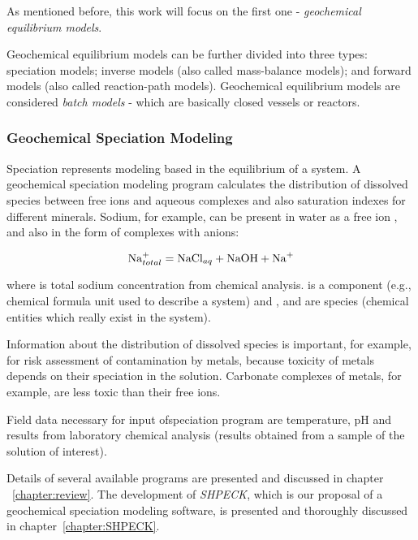 As mentioned before, this work will focus on the first one - \emph{geochemical equilibrium models}.

Geochemical equilibrium models can be further divided into three types: speciation models; inverse models (also called mass-balance models); and forward models (also called reaction-path models). Geochemical equilibrium models are considered \emph{batch models} - which are basically closed vessels or reactors.

\subsubsection{Geochemical Speciation Modeling}
Speciation represents modeling based in the equilibrium of a system. A geochemical speciation modeling program calculates the distribution of dissolved species between free ions and aqueous complexes and also saturation indexes for different minerals. Sodium, for example, can be present in water as a free ion , and also in the form of complexes with anions:

\begin{equation}
\ce{Na^+}_{total} = \ce{NaCl}_{aq} + \ce{NaOH} + \ce{Na^+}
\end{equation}

where  is total sodium concentration from chemical analysis.  is a component (e.g., chemical formula unit used to describe a system) and ,  and  are species (chemical entities which really exist in the system). 

Information about the distribution of dissolved species is important, for example, for risk assessment of contamination by metals, because toxicity of metals depends on their speciation in the solution. Carbonate complexes of metals, for example, are less toxic than their free ions.

Field data necessary for input ofspeciation program are temperature, pH and results from laboratory chemical analysis (results obtained from a sample of the solution of interest).

Details of several available programs are presented and discussed in chapter ~\ref{chapter:review}. The development of \emph{SHPECK}, which is our proposal of a geochemical speciation modeling software, is presented and thoroughly discussed in chapter~\ref{chapter:SHPECK}. 

